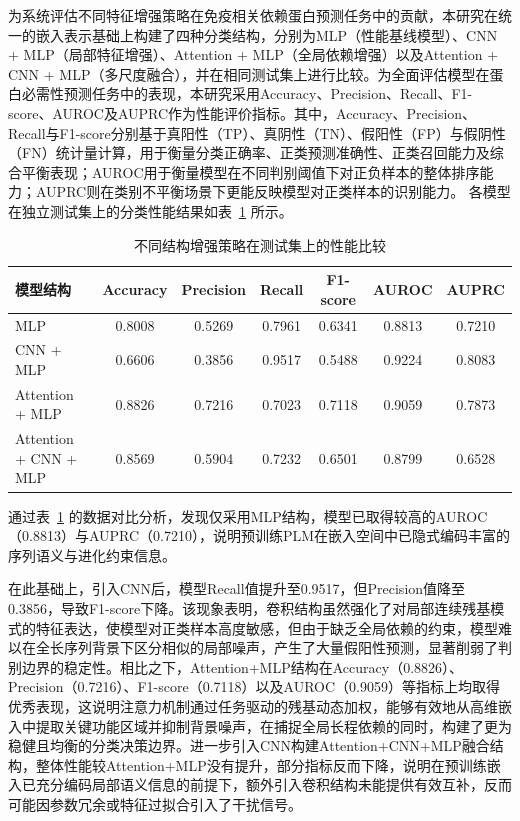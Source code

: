 为系统评估不同特征增强策略在免疫相关依赖蛋白预测任务中的贡献，本研究在统一的嵌入表示基础上构建了四种分类结构，分别为MLP（性能基线模型）、CNN + MLP（局部特征增强）、Attention + MLP（全局依赖增强）以及Attention + CNN + MLP（多尺度融合），并在相同测试集上进行比较。为全面评估模型在蛋白必需性预测任务中的表现，本研究采用Accuracy、Precision、Recall、F1-score、AUROC及AUPRC作为性能评价指标。其中，Accuracy、Precision、Recall与F1-score分别基于真阳性（TP）、真阴性（TN）、假阳性（FP）与假阴性（FN）统计量计算，用于衡量分类正确率、正类预测准确性、正类召回能力及综合平衡表现；AUROC用于衡量模型在不同判别阈值下对正负样本的整体排序能力；AUPRC则在类别不平衡场景下更能反映模型对正类样本的识别能力。
各模型在独立测试集上的分类性能结果如表~\ref{tab:module} 所示。

\begin{table}[htbp]
\centering
\caption{不同结构增强策略在测试集上的性能比较}
\label{tab:module}
\begin{tabular}{lcccccc}
\toprule
模型结构 & Accuracy & Precision & Recall & F1-score & AUROC & AUPRC \\
\midrule
MLP & 0.8008 & 0.5269 & 0.7961 & 0.6341 & 0.8813 & 0.7210 \\
CNN + MLP & 0.6606 & 0.3856 & 0.9517 & 0.5488 & 0.9224 & 0.8083 \\
Attention + MLP & 0.8826 & 0.7216 & 0.7023 & 0.7118 & 0.9059 & 0.7873 \\
Attention + CNN + MLP & 0.8569 & 0.5904 & 0.7232 & 0.6501 & 0.8799 & 0.6528 \\
\bottomrule
\end{tabular}
\end{table}

通过表~\ref{tab:module} 的数据对比分析，发现仅采用MLP结构，模型已取得较高的AUROC（0.8813）与AUPRC（0.7210），说明预训练PLM在嵌入空间中已隐式编码丰富的序列语义与进化约束信息。

在此基础上，引入CNN后，模型Recall值提升至0.9517，但Precision值降至0.3856，导致F1-score下降。该现象表明，卷积结构虽然强化了对局部连续残基模式的特征表达，使模型对正类样本高度敏感，但由于缺乏全局依赖的约束，模型难以在全长序列背景下区分相似的局部噪声，产生了大量假阳性预测，显著削弱了判别边界的稳定性。相比之下，Attention+MLP结构在Accuracy（0.8826）、Precision（0.7216）、F1-score（0.7118）以及AUROC（0.9059）等指标上均取得优秀表现，这说明注意力机制通过任务驱动的残基动态加权，能够有效地从高维嵌入中提取关键功能区域并抑制背景噪声，在捕捉全局长程依赖的同时，构建了更为稳健且均衡的分类决策边界。进一步引入CNN构建Attention+CNN+MLP融合结构，整体性能较Attention+MLP没有提升，部分指标反而下降，说明在预训练嵌入已充分编码局部语义信息的前提下，额外引入卷积结构未能提供有效互补，反而可能因参数冗余或特征过拟合引入了干扰信号。


